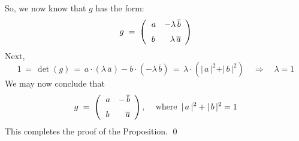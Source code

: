 So, we now know that $g$ has the form:
\begin{equation*}
g
\; = \;
	\left(\begin{array}{rr}
		a & -\lambda\,\overline{b}
		\\
		\overset{{\color{white}-}}{b} & \lambda\,\overline{a}
		\end{array}\right)
\end{equation*}
Next,
\begin{equation*}
1
\,=\, \det(g)
\,=\, a\cdot(\lambda\,\overline{a}) - b \cdot (-\lambda\,\overline{b})
\,=\, \lambda\cdot(\vert\,a\,\vert^{2} + \vert\,b\,\vert^{2})
\quad\Longrightarrow\quad
	\lambda = 1
\end{equation*}
We may now conclude that
\begin{equation*}
g
\; = \;
	\left(\begin{array}{rr}
		a & -\,\overline{b}
		\\
		\overset{{\color{white}-}}{b} & \overline{a}
		\end{array}\right),\,
\quad
\textnormal{where \,$\vert\,a\,\vert^{2} + \vert\,b\,\vert^{2} = 1$}
\end{equation*}
This completes the proof of the Proposition.
\qed


